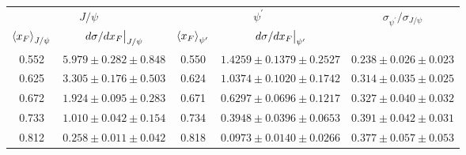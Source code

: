 \begin{tabular}{cc|cc|c}
\hline
\multicolumn{2}{c|}{$J/\psi$} &
  \multicolumn{2}{c|}{$\psi^{\prime}$} &
  \multirow{2}{*}{$\sigma_{\psi^\prime}/\sigma_{J/\psi}$} \\ \cline{1-4}
$\expval{x_F}_{J/\psi}$ &
  $\eval{d\sigma/dx_F}_{J/\psi}$ &
  $\expval{x_F}_{\psi^\prime}$ &
  $\eval{d\sigma/dx_F}_{\psi^\prime}$ &
   \\ \hline
0.552 & $5.979\pm0.282\pm0.848$ & 0.550 & $1.4259\pm0.1379\pm0.2527$ & $0.238\pm0.026\pm0.023$ \\
0.625 & $3.305\pm0.176\pm0.503$ & 0.624 & $1.0374\pm0.1020\pm0.1742$ & $0.314\pm0.035\pm0.025$ \\
0.672 & $1.924\pm0.095\pm0.283$ & 0.671 & $0.6297\pm0.0696\pm0.1217$ & $0.327\pm0.040\pm0.032$ \\
0.733 & $1.010\pm0.042\pm0.154$ & 0.734 & $0.3948\pm0.0396\pm0.0653$ & $0.391\pm0.042\pm0.031$ \\
0.812 & $0.258\pm0.011\pm0.042$ & 0.818 & $0.0973\pm0.0140\pm0.0266$ & $0.377\pm0.057\pm0.053$ \\ \hline
\end{tabular}
